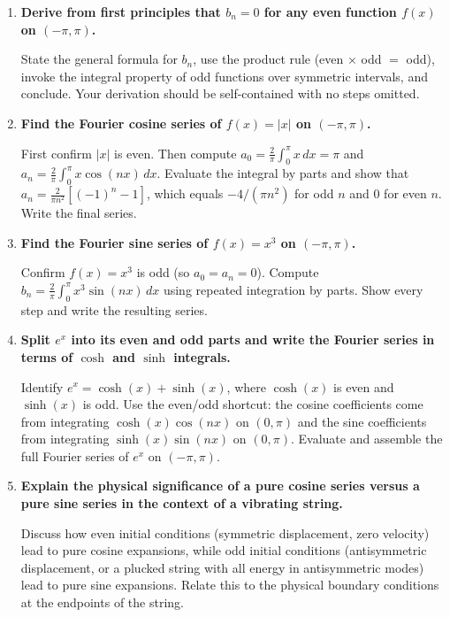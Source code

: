 \documentclass[12pt,a4paper]{article}
\begin{document}
\begin{enumerate}[label=\textbf{D\arabic*.}]

\item \textbf{Derive from first principles that $b_n = 0$ for any even function $f(x)$ on
  $(-\pi, \pi)$.}

  State the general formula for $b_n$, use the product rule (even $\times$ odd $=$ odd),
  invoke the integral property of odd functions over symmetric intervals, and conclude. Your
  derivation should be self-contained with no steps omitted.

\item \textbf{Find the Fourier cosine series of $f(x) = |x|$ on $(-\pi, \pi)$.}

  First confirm $|x|$ is even. Then compute $a_0 = \frac{2}{\pi}\int_{0}^{\pi} x\,dx = \pi$
  and $a_n = \frac{2}{\pi}\int_{0}^{\pi} x\cos(nx)\,dx$. Evaluate the integral by parts and
  show that $a_n = \frac{2}{\pi n^2}[(-1)^n - 1]$, which equals $-4/(\pi n^2)$ for odd $n$
  and $0$ for even $n$. Write the final series.

\item \textbf{Find the Fourier sine series of $f(x) = x^3$ on $(-\pi, \pi)$.}

  Confirm $f(x) = x^3$ is odd (so $a_0 = a_n = 0$). Compute
  $b_n = \frac{2}{\pi}\int_{0}^{\pi} x^3\sin(nx)\,dx$ using repeated integration by parts.
  Show every step and write the resulting series.

\item \textbf{Split $e^x$ into its even and odd parts and write the Fourier series in terms
  of $\cosh$ and $\sinh$ integrals.}

  Identify $e^x = \cosh(x) + \sinh(x)$, where $\cosh(x)$ is even and $\sinh(x)$ is odd.
  Use the even/odd shortcut: the cosine coefficients come from integrating $\cosh(x)\cos(nx)$
  on $(0,\pi)$ and the sine coefficients from integrating $\sinh(x)\sin(nx)$ on $(0,\pi)$.
  Evaluate and assemble the full Fourier series of $e^x$ on $(-\pi,\pi)$.

\item \textbf{Explain the physical significance of a pure cosine series versus a pure sine
  series in the context of a vibrating string.}

  Discuss how even initial conditions (symmetric displacement, zero velocity) lead to pure
  cosine expansions, while odd initial conditions (antisymmetric displacement, or a plucked
  string with all energy in antisymmetric modes) lead to pure sine expansions. Relate this
  to the physical boundary conditions at the endpoints of the string.

\end{enumerate}
\end{document}

